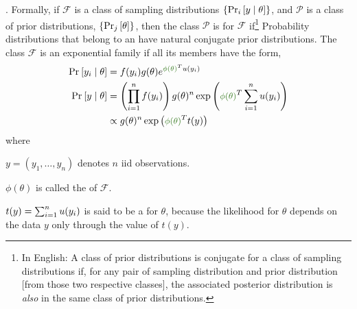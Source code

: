 \documentclass[11pt]{article}
\begin{document}
\myspace
\p {}. Formally, if $\mathcal{F}$ is a class of sampling distributions $\{  \Prob[i]{y \mid \theta}  \}$, and $\mathcal{P}$ is a class of prior distributions, $\{  \Prob[j]{\theta} \}$, then the class $\mathcal{P}$ is  for $\mathcal{F}$ if\footnote{In English: A class of prior distributions is conjugate for a class of sampling distributions if, for any pair of sampling distribution and prior distribution [from those two respective classes], the associated posterior distribution is \textit{also} in the same class of prior distributions.}
Probability distributions that belong to an  have natural conjugate prior distributions. The class $\mathcal{F}$ is an exponential family if all its members have the form,
\begin{align}
	\Prob{y_i \mid \theta} &= f(y_i) g(\theta) e^{\mgreen{\phi(\theta)}^T u(y_i)} \\
	\Prob{y \mid \theta} &= \left( \prod_{i=1}^n f(y_i) \right) g(\theta)^n \exp\left(  \mgreen{\phi(\theta)}^T \insum u(y_i) \right) \\
	&\propto g(\theta)^n \exp\left(  \mgreen{\phi(\theta)}^T t(y) \right)
\end{align}
where
\begin{compactitem}
\item $y = (y_1, \ldots, y_n)$ denotes $n$ iid observations.
\item $\phi(\theta)$ is called the  of $\mathcal{F}$. 
\item $t(y) = \insum u(y_i)$ is said to be a  for $\theta$, because the likelihood for $\theta$ depends on the data $y$ only through the value of $t(y)$. 
\end{compactitem}
\end{document}
